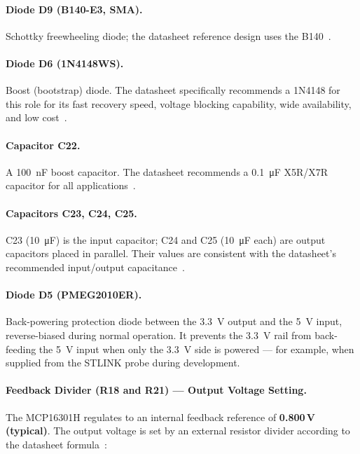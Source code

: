 \paragraph{Diode D9 (B140-E3, SMA).}
Schottky freewheeling diode; the datasheet reference design uses the B140~\cite{ref2}.

\paragraph{Diode D6 (1N4148WS).}
Boost (bootstrap) diode. The datasheet specifically recommends a 1N4148 for this role for
its fast recovery speed, voltage blocking capability, wide availability, and low
cost~\cite{ref2}.

\paragraph{Capacitor C22.}
A \SI{100}{\nano\farad} boost capacitor. The datasheet recommends a \SI{0.1}{\micro\farad}
X5R/X7R capacitor for all applications~\cite{ref2}.

\paragraph{Capacitors C23, C24, C25.}
C23 (\SI{10}{\micro\farad}) is the input capacitor; C24 and C25
(\SI{10}{\micro\farad} each) are output capacitors placed in parallel. Their values are
consistent with the datasheet's recommended input/output capacitance~\cite{ref2}.

\paragraph{Diode D5 (PMEG2010ER).}
Back-powering protection diode between the \SI{3.3}{\volt} output and the \SI{5}{\volt}
input, reverse-biased during normal operation. It prevents the \SI{3.3}{\volt} rail from
back-feeding the \SI{5}{\volt} input when only the \SI{3.3}{\volt} side is powered ---
for example, when supplied from the STLINK probe during development.

\paragraph{Feedback Divider (R18 and R21) --- Output Voltage Setting.}
The MCP16301H regulates to an internal feedback reference of \textbf{0.800\,V (typical)}.
The output voltage is set by an external resistor divider according to the datasheet
formula~\cite{ref2}:


